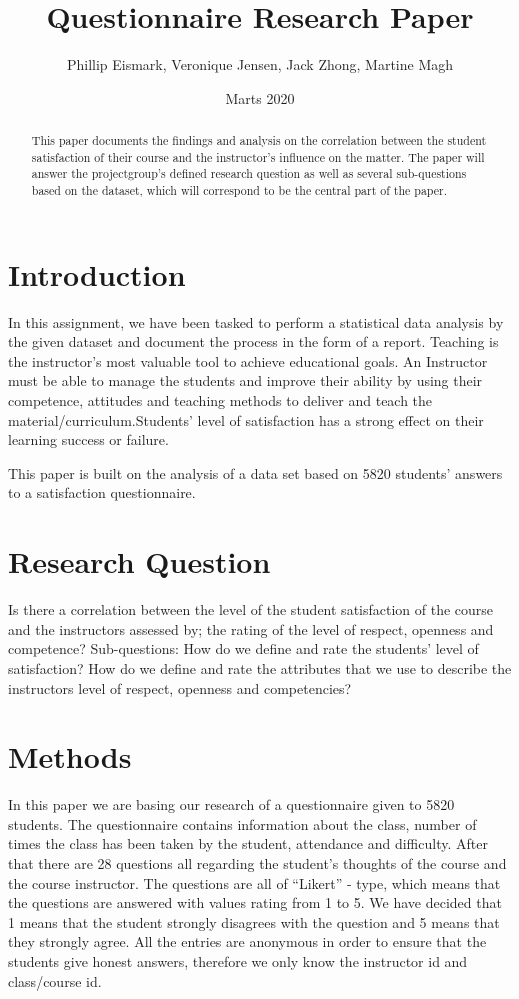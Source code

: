 \documentclass[twocolumn]{article}
\title{Questionnaire Research Paper}
\author{Phillip Eismark, Veronique Jensen, Jack Zhong, Martine Magh}
\date{Marts 2020}
\begin{document}
\maketitle

\begin{abstract}
This paper documents the findings and analysis on the correlation between the student satisfaction of their course and the instructor's influence on the matter. The paper will answer the projectgroup’s defined research question as well as several sub-questions based on the dataset, which will correspond to be the central part of the paper.  
\end{abstract}

\section{Introduction}\label{section-introduction}

In this assignment, we have been tasked to perform a statistical data analysis by the given dataset and document the process in the form of a report.  
Teaching is the instructor's most valuable tool to achieve educational goals. An Instructor must be able to manage the students and improve their ability by using their competence, attitudes and teaching methods to deliver and teach the material/curriculum.Students' level of satisfaction has a strong effect on their learning success or failure.

This paper is built on the analysis of a data set based on 5820 students' answers to a satisfaction questionnaire.

\section{Research Question}\label{section-topological}

Is there a correlation between the level of the student satisfaction of the course and the instructors assessed by; the rating of the level of respect, openness and competence?
Sub-questions:
How do we define and rate the students' level of satisfaction?
How do we define and rate the attributes that we use to describe the instructors level of respect, openness and competencies?


\section{Methods}\label{section-colored}

In this paper we are basing our research of a questionnaire given to 5820 students. The questionnaire contains information about the class, number of times the class has been taken by the student, attendance and difficulty. After that there are 28 questions all regarding the student’s thoughts of the course and the course instructor. The questions are all of “Likert” - type, which means that the questions are answered with values rating from 1 to 5. We have decided that 1 means that the student strongly disagrees with the question and 5 means that they strongly agree.
All the entries are anonymous in order to ensure that the students give honest answers, therefore we only know the instructor id and class/course id.
 
\end{document}
